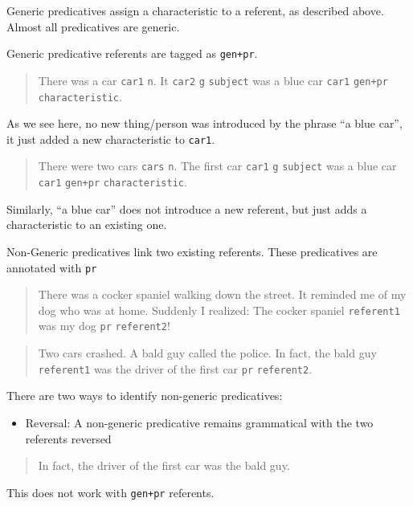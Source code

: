 \documentclass[
]{book}
\providecommand{\tightlist}{%
  \setlength{\itemsep}{0pt}\setlength{\parskip}{0pt}}
\begin{document}
Generic predicatives assign a characteristic to a referent,
as described above.
Almost all predicatives are generic.

Generic predicative referents are tagged as \texttt{gen+pr}.

\begin{quote}
There was a car \texttt{car1} \texttt{n}.
It \texttt{car2} \texttt{g} \texttt{subject} was a blue car \texttt{car1} \texttt{gen+pr} \texttt{characteristic}.
\end{quote}

As we see here, no new thing/person was introduced by the phrase ``a blue car'', it just added a new characteristic to \texttt{car1}.

\begin{quote}
There were two cars \texttt{cars} \texttt{n}.
The first car \texttt{car1} \texttt{g} \texttt{subject} was a blue car \texttt{car1} \texttt{gen+pr} \texttt{characteristic}.
\end{quote}

Similarly, ``a blue car'' does not introduce a new referent, but just adds a characteristic to an existing one.

Non-Generic predicatives link two existing referents.
These predicatives are annotated with \texttt{pr}

\begin{quote}
There was a cocker spaniel walking down the street.
It reminded me of my dog who was at home.
Suddenly I realized:
The cocker spaniel \texttt{referent1} was my dog \texttt{pr} \texttt{referent2}!
\end{quote}

\begin{quote}
Two cars crashed.
A bald guy called the police.
In fact, the bald guy \texttt{referent1}
was the driver of the first car \texttt{pr} \texttt{referent2}.
\end{quote}

There are two ways to identify non-generic predicatives:

\begin{itemize}
\tightlist
\item
  Reversal: A non-generic predicative remains grammatical
  with the two referents reversed
\end{itemize}

\begin{quote}
In fact, the driver of the first car was the bald guy.
\end{quote}

This does not work with \texttt{gen+pr} referents.
\end{document}
